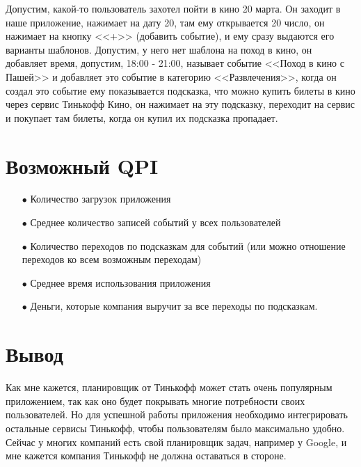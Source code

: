 \documentclass[a4paper,12pt]{article} %
\begin{document}
Допустим, какой-то пользователь захотел пойти в кино 20 марта. Он заходит в наше приложение, нажимает на дату 20, там ему открывается 20 число, он нажимает на кнопку <<+>> (добавить событие), и ему сразу выдаются его варианты шаблонов. Допустим, у него нет шаблона на поход в кино, он добавляет время, допустим, 18:00 - 21:00, называет событие <<Поход в кино с Пашей>> и добавляет это событие в категорию <<Развлечения>>, когда он создал это событие ему показывается подсказка, что можно купить билеты в кино через сервис Тинькофф Кино, он нажимает на эту подсказку, переходит на сервис и покупает там билеты, когда он купил их подсказка пропадает.

\section*{Возможный QPI}

\begin{enumerate}

\item[$\bullet$] Количество загрузок приложения

\item[$\bullet$] Среднее количество записей событий у всех пользователей

\item[$\bullet$] Количество переходов по подсказкам для событий (или можно отношение переходов ко всем возможным переходам)

\item[$\bullet$] Среднее время использования приложения

\item[$\bullet$] Деньги, которые компания выручит за все переходы по подсказкам.

\end{enumerate}

\section*{Вывод}

Как мне кажется, планировщик от Тинькофф может стать очень популярным приложением, так как оно будет покрывать многие потребности своих пользователей. Но для успешной работы приложения необходимо интегрировать остальные сервисы Тинькофф, чтобы пользователям было максимально удобно. Сейчас у многих компаний есть свой планировщик задач, например у Google, и мне кажется компания Тинькофф не должна оставаться в стороне.
\end{document}
